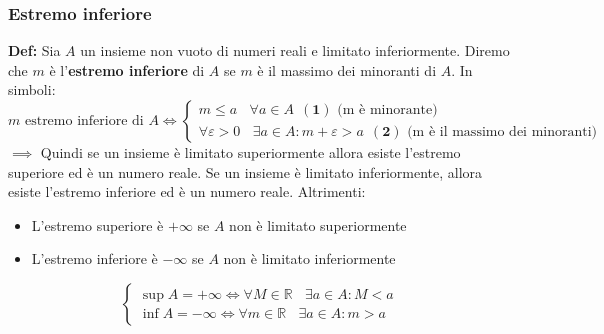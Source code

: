 \documentclass{article}
\newcommand{\R}{\mathbb{R}}
\begin{document}
\subsubsection{Estremo inferiore}
\textbf{Def:} Sia $A$ un insieme non vuoto di numeri reali e limitato inferiormente. Diremo che $m$ è l'\textbf{estremo inferiore} di $A$ se $m$ è il massimo dei minoranti di $A$. In simboli:
\[
    m \text{ estremo inferiore di } A \iff \begin{cases}
        m \leq a  \ \ \ \ \forall a \in A \ \ (\textbf{1}) \text{ (m è minorante)} \\
        \forall \varepsilon > 0 \ \ \ \ \exists a \in A : m + \varepsilon > a \ \ (\textbf{2}) \text{ (m è il massimo dei minoranti)}
    \end{cases}
\]
$\implies$ Quindi se un insieme è limitato superiormente allora esiste l'estremo superiore ed è un numero reale. Se un insieme è limitato inferiormente, allora esiste l'estremo inferiore ed è un numero reale.
Altrimenti:
\begin{itemize}
    \item L'estremo superiore è $+\infty$ se $A$ non è limitato superiormente
    \item L'estremo inferiore è $-\infty$ se $A$ non è limitato inferiormente
\end{itemize}
\[
    \begin{cases}
        \sup A = +\infty \iff \forall M \in \R \ \ \ \ \exists a \in A : M < a \\
        \inf A = -\infty \iff \forall m \in \R \ \ \ \ \exists a \in A : m > a
    \end{cases}
\]
\end{document}
